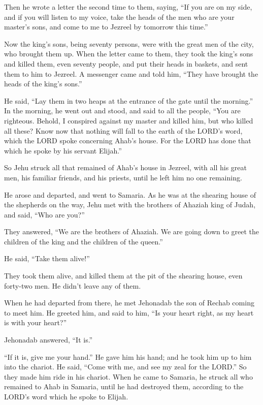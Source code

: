  Then he wrote a letter the second time to them, saying,
``If you are on my side, and if you will listen to my voice, take the
heads of the men who are your master's sons, and come to me to Jezreel
by tomorrow this time.''

Now the king's sons, being seventy persons, were with the great men of
the city, who brought them up.  When the letter came to
them, they took the king's sons and killed them, even seventy people,
and put their heads in baskets, and sent them to him to Jezreel.
 A messenger came and told him, ``They have brought the
heads of the king's sons.''

He said, ``Lay them in two heaps at the entrance of the gate until the
morning.''  In the morning, he went out and stood, and
said to all the people, ``You are righteous. Behold, I conspired against
my master and killed him, but who killed all these?  Know
now that nothing will fall to the earth of the LORD's word, which the
LORD spoke concerning Ahab's house. For the LORD has done that which he
spoke by his servant Elijah.''

 So Jehu struck all that remained of Ahab's house in
Jezreel, with all his great men, his familiar friends, and his priests,
until he left him no one remaining.

 He arose and departed, and went to Samaria. As he was at
the shearing house of the shepherds on the way,  Jehu met
with the brothers of Ahaziah king of Judah, and said, ``Who are you?''

They answered, ``We are the brothers of Ahaziah. We are going down to
greet the children of the king and the children of the queen.''

 He said, ``Take them alive!''

They took them alive, and killed them at the pit of the shearing house,
even forty-two men. He didn't leave any of them.

 When he had departed from there, he met Jehonadab the
son of Rechab coming to meet him. He greeted him, and said to him, ``Is
your heart right, as my heart is with your heart?''

Jehonadab answered, ``It is.''

``If it is, give me your hand.'' He gave him his hand; and he took him
up to him into the chariot.  He said, ``Come with me, and
see my zeal for the LORD.'' So they made him ride in his chariot.
 When he came to Samaria, he struck all who remained to
Ahab in Samaria, until he had destroyed them, according to the LORD's
word which he spoke to Elijah.

